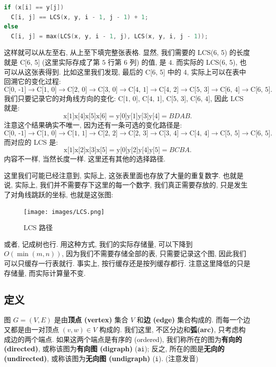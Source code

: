 \documentclass[a4paper]{ctexart}
\theoremstyle{definition}
\theoremstyle{definition}
\begin{document}
\begin{lstlisting}[language=c++]
  if (x[i] == y[j])
  C[i, j] == LCS(x, y, i - 1, j - 1) + 1;   
else
  C[i, j] = max(LCS(x, y, i - 1, j), LCS(x, y, i, j - 1));
\end{lstlisting}

这样就可以从左至右, 从上至下填完整张表格. 显然, 
我们需要的 LCS(6, 5) 的长度就是 C[6, 5] 
(这里实际存成了第 $5$ 行第 $6$ 列) 的值, 是 $4$. 
而实际的 LCS(6, 5), 也可以从这张表得到. 
比如这里我们发现, 最后的 C[6, 5] 中的 4, 实际上可以在表中回溯它的变化过程:
$$
\mbox{C[0, -1]} \to \mbox{C[1, 0]} \to \mbox{C[2, 0]} \to \mbox{C[3, 0]} \to \mbox{C[4, 1]} \to \mbox{C[4, 2]} \to \mbox{C[5, 3]} \to \mbox{C[6, 4]} \to \mbox{C[6, 5]}.
$$
我们只要记录它的对角线方向的变化: 
$\mbox{C[1, 0]}$, $\mbox{C[4, 1]}$, $\mbox{C[5, 3]}$, $\mbox{C[6, 4]}$, 
因此 LCS 就是:
$$
\mbox{x[1]x[4]x[5]x[6]} = \mbox{y[0]y[1]y[3]y[4]}=BDAB.
$$
注意这个结果确实不唯一, 因为还有一条可选的变化路径是:
$$
\mbox{C[0, -1]} \to \mbox{C[1, 0]} \to \mbox{C[1, 1]} \to \mbox{C[2, 2]} \to \mbox{C[2, 3]} \to \mbox{C[3, 4]} \to \mbox{C[4, 4]} \to \mbox{C[5, 5]} \to \mbox{C[6, 5]}.
$$
而对应的 LCS 是:
$$
\mbox{x[1]x[2]x[3]x[5]} = \mbox{y[0]y[2]y[4]y[5]}=BCBA.
$$
内容不一样, 当然长度一样. 这里还有其他的选择路径.

这里我们可能已经注意到, 实际上, 这张表里面也存放了大量的重复数字. 
也就是说, 实际上, 我们并不需要存下这里的每一个数字, 
我们真正需要存放的, 只是发生了对角线跳跃的坐标, 也就是这张图:
\begin{figure}[h]  
  \centering  
  \texttt{[image: images/LCS.png]}
  \caption{LCS 路径} %
\end{figure}  

或者, 记成树也行. 用这种方式, 我们的实际存储量, 
可以下降到 $O(\min(m, n))$, 因为我们不需要存储全部的表, 
只需要记录这个图, 因此我们可以只缓存一行表就行. 
事实上, 按行缓存还是按列缓存都行. 注意这里降低的只是存储量, 
而实际计算量不变.

\subsection{定义}

 图 $G = (V, E)$ 是由{\bf 顶点 (vertex)} 集合
$V$ 和{\bf 边 (edge)} 集合构成的. 而每一个边又都是由一对顶点 $(v, w) \in V$ 构成的.
我们这里, 不区分边和{\bf 弧(arc)}, 只考虑构成边的两个端点.
如果这两个端点是有序的 (ordered), 我们称所在的图为{\bf 有向的 (directed)},
或称该图为{\bf 有向图 (digraph)} (\verb|ai|); 反之, 所在的图是{\bf 无向的 (undirected)},
或称该图为{\bf 无向图 (undigraph)} (\verb|i|). (注意发音)
\end{document}
